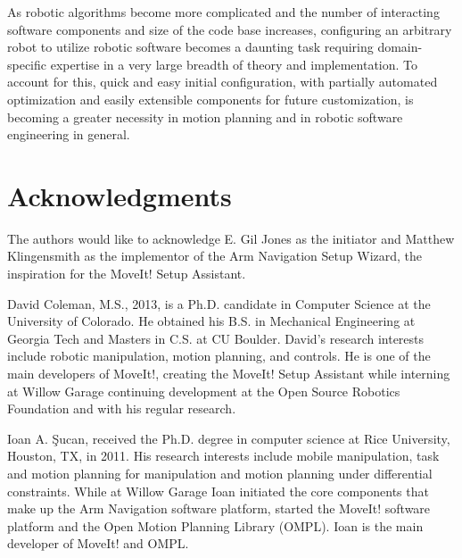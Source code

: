 \documentclass[10pt,journal,compsoc]{joser1}
\begin{document}
{As robotic algorithms become more complicated and the number of interacting
software components and size of the code base increases, configuring an
arbitrary robot to utilize robotic software becomes a daunting task requiring
domain-specific expertise in a very large breadth of theory and implementation.
To account for this, quick and easy initial configuration, with partially
automated optimization and easily extensible components for future
customization, is becoming a greater necessity in motion planning and in robotic
software engineering in general. 

\section*{Acknowledgments}
The authors would like to acknowledge E. Gil Jones as the initiator and Matthew
Klingensmith as the implementor of the Arm Navigation Setup Wizard, the
inspiration for the MoveIt! Setup Assistant.





\begin{IEEEbiography}[{coleman_20131110_f01}]{David Coleman}, M.S., 2013, is a
Ph.D. candidate in Computer Science at the University of Colorado. He obtained
his B.S. in Mechanical Engineering at Georgia Tech and Masters in C.S. at CU
Boulder. David's research interests include robotic manipulation, motion
planning, and controls. He is one of the main developers of MoveIt!, creating
the MoveIt! Setup Assistant while interning at Willow Garage continuing
development at the Open Source Robotics Foundation and with his regular
research.
\end{IEEEbiography}

\begin{IEEEbiography}[{coleman_20131110_f02}]{Ioan A. \c{S}ucan}, 
received the Ph.D. degree in computer science at Rice University,
Houston, TX, in 2011. His research interests include mobile
manipulation, task and motion planning for manipulation and motion
planning under differential constraints. While at Willow Garage
Ioan initiated the core components that make up the Arm
Navigation software platform, started the MoveIt! software platform
and the Open Motion Planning Library (OMPL). Ioan is the main
developer of MoveIt! and OMPL.
\end{IEEEbiography}

}
\end{document}
